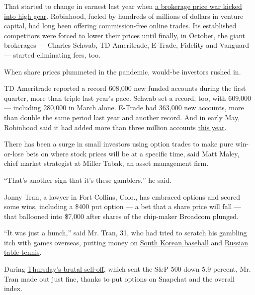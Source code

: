 That started to change in earnest last year when
\href{https://www.nytimes3xbfgragh.onion/2019/10/01/your-money/charles-schwab-free-trades.html}{a
brokerage price war kicked into high gear}. Robinhood, fueled by
hundreds of millions of dollars in venture capital, had long been
offering commission-free online trades. Its established competitors were
forced to lower their prices until finally, in October, the giant
brokerages --- Charles Schwab, TD Ameritrade, E-Trade, Fidelity and
Vanguard --- started eliminating fees, too.

When share prices plummeted in the pandemic, would-be investors rushed
in.

TD Ameritrade reported a record 608,000 new funded accounts during the
first quarter, more than triple last year's pace. Schwab set a record,
too, with 609,000 --- including 280,000 in March alone. E-Trade had
363,000 new accounts, more than double the same period last year and
another record. And in early May, Robinhood said it had added more than
three million accounts
\href{https://blog.robinhood.com/news/2020/5/4/robinhood-raises-280-million-in-series-f-funding-led-by-sequoia}{this
year}.

There has been a surge in small investors using option trades to make
pure win-or-lose bets on where stock prices will be at a specific time,
said Matt Maley, chief market strategist at Miller Tabak, an asset
management firm.

``That's another sign that it's these gamblers,'' he said.

Jonny Tran, a lawyer in Fort Collins, Colo., has embraced options and
scored some wins, including a \$400 put option --- a bet that a share
price will fall --- that ballooned into \$7,000 after shares of the
chip-maker Broadcom plunged.

``It was just a hunch,'' said Mr. Tran, 31, who had tried to scratch his
gambling itch with games overseas, putting money on
\href{https://www.nytimes3xbfgragh.onion/2020/05/07/sports/coronavirus-korea-baseball-opening.html}{South
Korean baseball} and
\href{https://dknation.draftkings.com/2020/3/25/21193214/professional-table-tennis-odds-how-to-watch-how-to-bet-ukraine-tt-cup-russia-setka-cup-ittf}{Russian
table tennis}.

During
\href{https://www.nytimes3xbfgragh.onion/2020/06/11/business/market-drop-coronavirus.html}{Thursday's
brutal sell-off}, which sent the S\&P 500 down 5.9 percent, Mr. Tran
made out just fine, thanks to put options on Snapchat and the overall
index.

